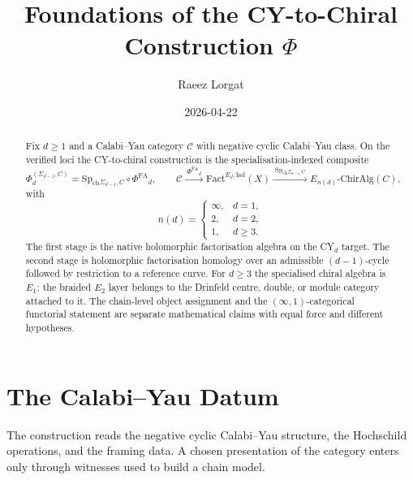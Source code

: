 \documentclass[11pt]{article}
\title{Foundations of the CY-to-Chiral Construction $\Phi$}
\author{Raeez Lorgat}
\date{2026-04-22}
\providecommand{\ChirAlg}{\mathrm{ChirAlg}}
\providecommand{\Fact}{\mathrm{Fact}}
\providecommand{\cC}{\mathcal{C}}
\providecommand{\PhiFA}{\Phi^{\mathrm{FA}}{}}
\providecommand{\SpCh}{\mathrm{Sp}_{\mathrm{ch}}{}}
\begin{document}
\maketitle

\begin{abstract}
Fix $d \geq 1$ and a Calabi--Yau category $\cC$ with negative cyclic
Calabi--Yau class.  On the verified loci the CY-to-chiral construction is
the specialisation-indexed composite
\[
 \Phi_d^{(\Sigma_{d-1}, C)}
 =
 \SpCh_{\Sigma_{d-1}, C}\circ \PhiFA_d,
 \qquad
 \cC \xrightarrow{\;\PhiFA_d\;} \Fact^{E_d,\mathrm{hol}}(X)
 \xrightarrow{\;\SpCh_{\Sigma_{d-1}, C}\;}
 E_{n(d)}\text{-}\ChirAlg(C),
\]
with
\[
 n(d)=
 \begin{cases}
 \infty, & d=1,\\
 2, & d=2,\\
 1, & d\geq 3.
 \end{cases}
\]
The first stage is the native holomorphic factorisation algebra on the
CY$_d$ target.  The second stage is holomorphic factorisation homology
over an admissible $(d-1)$-cycle followed by restriction to a reference
curve.  For $d\geq 3$ the specialised chiral algebra is $E_1$; the
braided $E_2$ layer belongs to the Drinfeld centre, double, or module
category attached to it.  The chain-level object assignment and the
$(\infty,1)$-categorical functorial statement are separate mathematical
claims with equal force and different hypotheses.
\end{abstract}

\tableofcontents

\section{The Calabi--Yau Datum}

The construction reads the negative cyclic Calabi--Yau structure, the
Hochschild operations, and the framing data.  A chosen presentation of
the category enters only through witnesses used to build a chain model.
\end{document}
